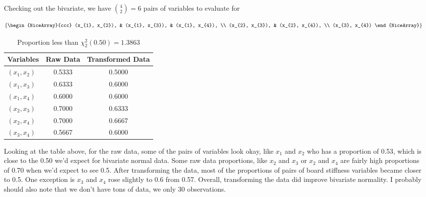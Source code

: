 Checking out the bivariate, we have ${4 \choose 2} = 6$ pairs of variables to evaluate for

\[
\left\{
    \begin{NiceArray}{ccc}
        (x_{1}, x_{2}), & (x_{1}, x_{3}), & (x_{1}, x_{4}), \\
        (x_{2}, x_{3}), & (x_{2}, x_{4}), \\
        (x_{3}, x_{4})
    \end{NiceArray}
\right\}
\]

\begin{table}[H]
    \caption*{Proportion less than $\chi_{2}^{2}(0.50) = 1.3863$}
    \centering
    \begin{tabular}{lcc}
        \hline %
        Variables & Raw Data & Transformed Data \\
        \hline %
        $(x_{1}, x_{2})$ & 0.5333 &    0.5000 \\
        $(x_{1}, x_{3})$ & 0.6333 &    0.6000 \\
        $(x_{1}, x_{4})$ & 0.6000 &    0.6000 \\
        $(x_{2}, x_{3})$ & 0.7000 &    0.6333 \\
        $(x_{2}, x_{4})$ & 0.7000 &    0.6667 \\
        $(x_{3}, x_{4})$ & 0.5667 &    0.6000 \\
        \hline %
    \end{tabular}
\end{table}

Looking at the table above, for the raw data, some of the pairs of variables look okay, like $x_{1}$ and $x_{2}$ who has a proportion of 0.53, which is close to the 0.50 we'd expect for bivariate normal data. Some raw data proportions, like $x_{2}$ and $x_{3}$ or $x_{2}$ and $x_{4}$ are fairly high proportions of 0.70 when we'd expect to see 0.5. After transforming the data, most of the proportions of pairs of board stiffness variables became closer to 0.5. One exception is $x_{3}$ and $x_{4}$ rose slightly to 0.6 from 0.57. Overall, transforming the data did improve bivariate normality. I probably should also note that we don't have tons of data, we only 30 observations.
